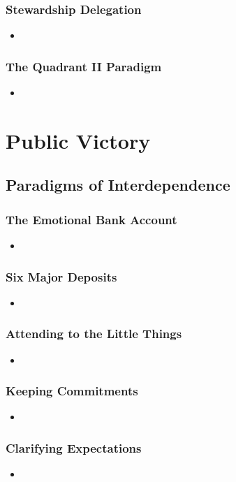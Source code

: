\documentclass[11pt]{article}
\begin{document}
\subsubsection{Stewardship Delegation}
\begin{itemize}
\item 
\end{itemize}
\subsubsection{The Quadrant II Paradigm}
\begin{itemize}
\item 
\end{itemize}
\section{Public Victory}
\subsection{Paradigms of Interdependence}
\subsubsection{The Emotional Bank Account}
\begin{itemize}
\item 
\end{itemize}
\subsubsection{Six Major Deposits}
\begin{itemize}
\item 
\end{itemize}
\subsubsection{Attending to the Little Things}
\begin{itemize}
\item 
\end{itemize}
\subsubsection{Keeping Commitments}
\begin{itemize}
\item 
\end{itemize}
\subsubsection{Clarifying Expectations}
\begin{itemize}
\item 
\end{itemize}
\end{document}
